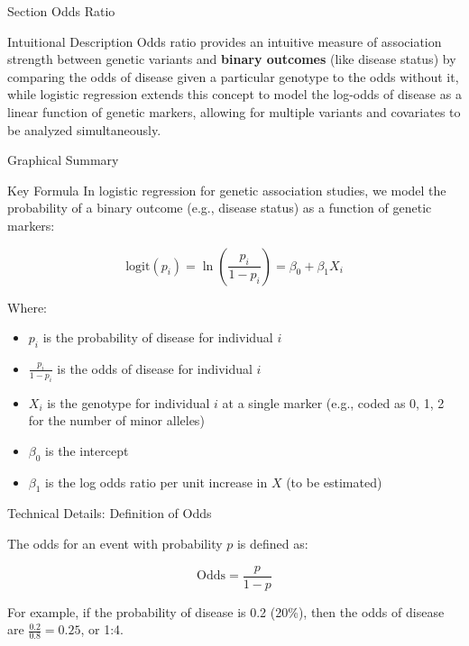 
\begin{frame}{Section}
\centering
\Huge{Odds Ratio}
\end{frame}


\begin{frame}{Intuitional Description}
Odds ratio provides an intuitive measure of association strength between genetic variants and \textbf{binary outcomes} (like disease status) by comparing the odds of disease given a particular genotype to the odds without it, while logistic regression extends this concept to model the log-odds of disease as a linear function of genetic markers, allowing for multiple variants and covariates to be analyzed simultaneously.
\end{frame}

\begin{frame}{Graphical Summary}

\end{frame}


\begin{frame}{Key Formula}
In logistic regression for genetic association studies, we model the probability of a binary outcome (e.g., disease status) as a function of genetic markers:

$$
\text{logit}(p_i) = \ln\left(\frac{p_i}{1-p_i}\right) = \beta_0 + \beta_1 X_i
$$

Where:
\begin{itemize}
\item $p_i$ is the probability of disease for individual $i$
\item $\frac{p_i}{1-p_i}$ is the odds of disease for individual $i$
\item $X_i$ is the genotype for individual $i$ at a single marker (e.g., coded as 0, 1, 2 for the number of minor alleles)
\item $\beta_0$ is the intercept
\item $\beta_1$ is the log odds ratio per unit increase in $X$ (to be estimated)
\end{itemize}

\end{frame}


\begin{frame}{Technical Details: Definition of Odds}

The odds for an event with probability $p$ is defined as:

$$
\text{Odds} = \frac{p}{1-p}
$$

For example, if the probability of disease is 0.2 (20\%), then the odds of disease are $\frac{0.2}{0.8} = 0.25$, or 1:4.

\end{frame}

